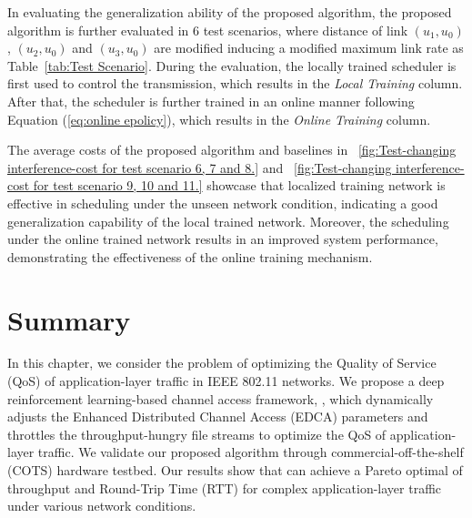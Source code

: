 In evaluating the generalization ability of the proposed algorithm, the proposed algorithm is further evaluated in $6$ test scenarios, where distance of link $(u_1,u_0)$, $(u_2,u_0)$ and $(u_3,u_0)$ are modified inducing a modified maximum link rate as Table~\ref{tab:Test Scenario}. During the evaluation, the locally trained scheduler is first used to control the transmission, which results in the \textit{Local Training} column. After that, the scheduler is further trained in an online manner following Equation (\ref{eq:online epolicy}), which results in the \textit{Online Training} column.

The average costs of the proposed algorithm and baselines in \figurename~\ref{fig:Test-changing interference-cost for test scenario 6, 7 and 8.} and \figurename~\ref{fig:Test-changing interference-cost for test scenario 9, 10 and 11.} showcase that localized training network is effective in scheduling under the unseen network condition, indicating a good generalization capability of the local trained network. 
Moreover, the scheduling under the online trained network results in an improved system performance, demonstrating the effectiveness of the online training mechanism.

\section{Summary}
\label{sec:chapter3_after-conclusion}
In this chapter, we consider the problem of optimizing the Quality of Service (QoS) of application-layer traffic in IEEE 802.11 networks. We propose a deep reinforcement learning-based channel access framework, {\algName}, which dynamically adjusts the Enhanced Distributed Channel Access (EDCA) parameters and throttles the throughput-hungry file streams to optimize the QoS of application-layer traffic.
We validate our proposed algorithm through commercial-off-the-shelf (COTS) hardware testbed.
Our results show that {\algName} can achieve a Pareto optimal of throughput and Round-Trip Time (RTT) for complex application-layer traffic under various network conditions.
